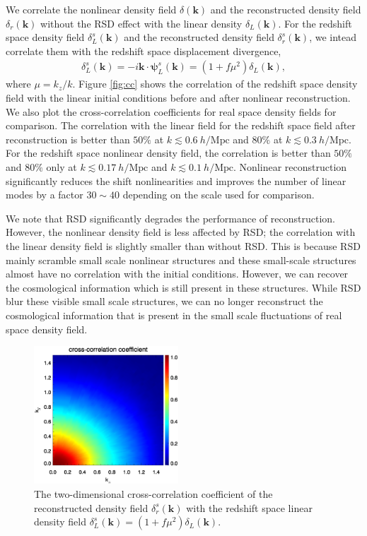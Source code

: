 \documentclass[aps,prx,twocolumn,superscriptaddress,groupedaddress,nofootinbib,amsfont]{revtex4}  %
\newcommand{\mr}{\mathrm}
\newcommand{\bea}{\begin{eqnarray}}
\newcommand{\eea}{\end{eqnarray}}
\newcommand{\bmp}{\bm{\psi}}
\newcommand{\bmk}{\bm{k}}
\begin{document}
We correlate the nonlinear density field $\delta(\bmk)$ and the reconstructed 
density field $\delta_r(\bmk)$ without the RSD effect with the linear density 
$\delta_L(\bmk)$.
For the redshift space density field $\delta_L^s(\bmk)$ and the reconstructed
density field $\delta_r^s(\bmk)$, we intead correlate them with the redshift 
space displacement divergence,
\bea
\delta^s_L(\bmk)=-i\bmk\cdot\bmp^s_L(\bmk)=(1+f\mu^2)\delta_L(\bmk),
\eea
where $\mu=k_z/k$.
Figure \ref{fig:cc} shows the correlation of the redshift space density field 
with the linear initial conditions before and after nonlinear reconstruction.
We also plot the cross-correlation coefficients for real space density fields
for comparison. 
The correlation with the linear field for the redshift space field after 
reconstruction is better than $50\%$ at $k\lesssim0.6\ h/\mr{Mpc}$ and $80\%$
at $k\lesssim0.3\ h/\mr{Mpc}$. For the redshift space nonlinear density field, 
the correlation is better than $50\%$ and $80\%$ only at $k\lesssim0.17\ h/\mr{Mpc}$ and $k\lesssim0.1\ h/\mr{Mpc}$.
Nonlinear reconstruction significantly reduces the shift nonlinearities and 
improves the number of linear modes by a factor $30\sim40$ depending on the 
scale used for comparison.

We note that RSD significantly degrades the performance of reconstruction.
However, the nonlinear density field is less affected by RSD; the correlation
with the linear density field is slightly smaller than without RSD.
This is because RSD mainly scramble small scale nonlinear structures and these 
small-scale structures almost have no correlation with the initial conditions.
However, we can recover the cosmological information which is still present in 
these structures. While RSD blur these visible small scale structures, we can  
no longer reconstruct the cosmological information that is present in the small
scale fluctuations of real space density field.

\begin{figure}[tbp]
\begin{center}
\includegraphics[width=0.48\textwidth]{0.000anixcc_deltaRsxLs_4x.eps}
\end{center}
\vspace{-0.7cm}
\caption{The two-dimensional cross-correlation coefficient of the reconstructed
density field $\delta_r^s(\bmk)$ with the redshift space linear density field 
$\delta_L^s(\bmk)=(1+f\mu^2)\delta_L(\bmk)$.}
\label{fig:cc_Ls}
\end{figure}
\end{document}

